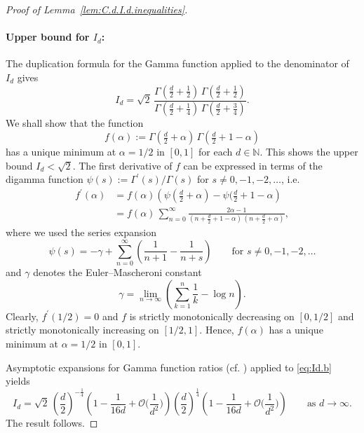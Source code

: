 \documentclass[12pt]{article}
\begin{document}
\begin{appendix}
\begin{proof}[Proof of Lemma~\ref{lem:C.d.I.d.inequalities}]
\paragraph{Upper bound for $I_d$:} The duplication formula for the Gamma function applied to the denominator of $I_d$ gives
\begin{equation} \label{eq:Id.b}
I_d = \sqrt{2} \, \frac{\Gamma(\tfrac{d}{2} + \tfrac{1}{2} ) \, \Gamma( \tfrac{d}{2} + \tfrac{1}{2} )}{\Gamma(\tfrac{d}{2} + \tfrac{1}{4} ) \, \Gamma( \tfrac{d}{2} + \tfrac{3}{4} )}.
\end{equation}
We shall show that the function
\begin{equation*}
f( \alpha ) := \Gamma( \tfrac{d}{2} + \alpha ) \, \Gamma( \tfrac{d}{2} + 1 - \alpha )
\end{equation*} 
has a unique minimum at $\alpha = 1/2$ in $[0,1]$ for each $d \in \mathbb{N}$. This shows the upper bound $I_d < \sqrt{2}$. The first derivative of $f$ can be expressed in terms of the digamma function $\psi( s ) := \Gamma^\prime(s) / \Gamma( s )$ for $s \neq 0, -1, -2, \dots$, i.e.
\begin{equation*}
\begin{split}
f^\prime( \alpha ) 
&= f( \alpha ) \left( \psi(\tfrac{d}{2} + \alpha ) - \psi( \tfrac{d}{2} + 1 - \alpha \right) \\
&= f( \alpha ) \, \sum_{n=0}^\infty \frac{2\alpha-1}{(n + \tfrac{d}{2} + 1 - \alpha ) \, ( n + \tfrac{d}{2} + \alpha )}, 
\end{split}
\end{equation*}
where we used the series expansion \cite[5.7.6]{NIST}
\begin{equation*}
\psi( s ) = - \gamma + \sum_{n=0}^\infty \left( \frac{1}{n+1} - \frac{1}{n + s} \right) \qquad \mbox{for } s \neq 0, -1, -2, \dots
\end{equation*}
and $\gamma$ denotes the Euler–Mascheroni constant
\begin{equation*}
\gamma = \lim_{n\to \infty} \left( \sum_{k=1}^n \frac{1}{k} - \log n \right).
\end{equation*}
Clearly, $f^\prime( 1/2 ) = 0$ and $f$ is strictly monotonically decreasing on $[0,1/2]$ and strictly monotonically increasing on $[1/2,1]$. Hence, $f(\alpha)$ has a unique minimum at $\alpha = 1/2$ in $[0,1]$. 

Asymptotic expansions for Gamma function ratios (cf. \cite[5.11.13, 5.11.15]{NIST}) applied to \eqref{eq:Id.b} yields
\begin{equation*}
I_d = \sqrt{2} \, \left( \frac{d}{2} \right)^{-\tfrac{1}{4}} \left( 1 - \frac{1}{16 d} + \mathcal{O}\Big( \frac{1}{d^2} \Big) \right) \left( \frac{d}{2} \right)^{\tfrac{1}{4}} \left( 1 - \frac{1}{16 d} + \mathcal{O}\Big( \frac{1}{d^2} \Big) \right) \qquad \text{as $d \to \infty$.}
\end{equation*}
The result follows. 


\end{proof}
\end{appendix}
\end{document}
